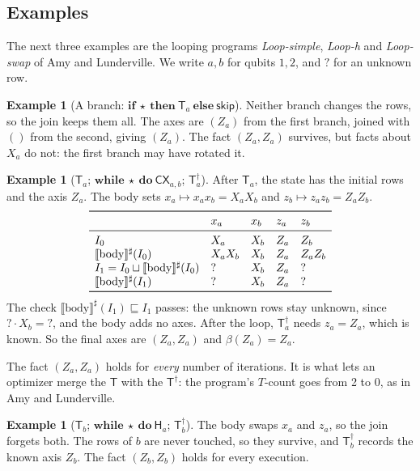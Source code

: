 \documentclass[11pt]{article}
\theoremstyle{definition}
\newtheorem{example}[theorem]{Example}
\theoremstyle{remark}
\newcommand{\abs}[1]{\llbracket #1 \rrbracket^{\sharp}}
\newcommand{\adj}{^{\dagger}}
\newcommand{\back}{\beta}
\newcommand{\gate}[1]{\mathsf{#1}}
\begin{document}
\subsection{Examples}

The next three examples are the looping programs \emph{Loop-simple}, \emph{Loop-h} and
\emph{Loop-swap} of Amy and Lunderville. We write $a, b$ for qubits $1, 2$, and $?$ for an
unknown row.

\begin{example}[A branch: $\textbf{if}\ \star\ \textbf{then}\ \gate T_a\ \textbf{else}\ \mathsf{skip}$]
Neither branch changes the rows, so the join keeps them all. The axes are $(Z_a)$ from the
first branch, joined with $()$ from the second, giving $(Z_a)$. The fact $(Z_a, Z_a)$
survives, but facts about $X_a$ do not: the first branch may have rotated it.
\end{example}

\begin{example}[$\gate T_a$; $\textbf{while}\ \star\ \textbf{do}\ \gate{CX}_{a,b}$; $\gate T\adj_a$]
After $\gate T_a$, the state has the initial rows and the axis $Z_a$. The body sets
$x_a \mapsto x_a x_b = X_aX_b$ and $z_b \mapsto z_a z_b = Z_aZ_b$.
\[
\begin{array}{lllll}
\toprule
 & x_a & x_b & z_a & z_b \\
\midrule
I_0 & X_a & X_b & Z_a & Z_b \\
\abs{\text{body}}(I_0) & X_aX_b & X_b & Z_a & Z_aZ_b \\
I_1 = I_0 \sqcup \abs{\text{body}}(I_0) & ? & X_b & Z_a & ? \\
\abs{\text{body}}(I_1) & ? & X_b & Z_a & ? \\
\bottomrule
\end{array}
\]
The check $\abs{\text{body}}(I_1) \sqsubseteq I_1$ passes: the unknown rows stay unknown,
since $? \cdot X_b = ?$, and the body adds no axes. After the loop, $\gate T\adj_a$ needs
$z_a = Z_a$, which is known. So the final axes are $(Z_a, Z_a)$ and $\back(Z_a) = Z_a$.

The fact $(Z_a, Z_a)$ holds for \emph{every} number of iterations. It is what lets an
optimizer merge the $\gate T$ with the $\gate T\adj$: the program's $T$-count goes from 2
to 0, as in Amy and Lunderville.
\end{example}

\begin{example}[$\gate T_b$; $\textbf{while}\ \star\ \textbf{do}\ \gate H_a$; $\gate T\adj_b$]
The body swaps $x_a$ and $z_a$, so the join forgets both. The rows of $b$ are never
touched, so they survive, and $\gate T\adj_b$ records the known axis $Z_b$. The fact
$(Z_b, Z_b)$ holds for every execution.
\end{example}
\end{document}

